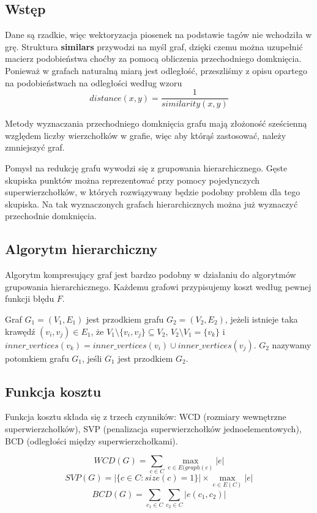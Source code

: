 \documentclass[a4paper,10pt]{article}
\begin{document}
\subsection{Wstęp}
Dane są rzadkie, więc wektoryzacja piosenek na podstawie tagów nie wchodziła w grę. 
Struktura \textbf{similars} przywodzi na myśl graf, dzięki czemu można uzupełnić macierz podobieństwa choćby za pomocą obliczenia przechodniego domknięcia.
Ponieważ w grafach naturalną miarą jest odległość, przeszliśmy z opisu opartego na podobieństwach na odległości według wzoru
\begin{equation}
 distance(x, y) = \frac{1}{similarity(x, y)}
\end{equation}

Metody wyznaczania przechodniego domknięcia grafu mają złożoność sześcienną względem liczby wierzchołków w grafie, 
więc aby którąś zastosować, należy zmniejszyć graf.

Pomysł na redukcję grafu wywodzi się z grupowania hierarchicznego.
Gęste skupiska punktów można reprezentować przy pomocy pojedynczych superwierzchołków, w których rozwiązywany będzie podobny problem dla tego skupiska.
Na tak wyznaczonych grafach hierarchicznych można już wyznaczyć przechodnie domknięcia.

\subsection{Algorytm hierarchiczny}
Algorytm kompresujący graf jest bardzo podobny w działaniu do algorytmów grupowania hierarchicznego.
Każdemu grafowi przypisujemy koszt według pewnej funkcji błędu $F$.

Graf $G_1 = (V_1, E_1)$ jest przodkiem grafu $G_2 = (V_2, E_2)$, jeżeli istnieje taka krawędź $(v_i, v_j) \in E_1$, że $V_1 \setminus \{v_i, v_j\} \subseteq V_2$, 
$V_2 \setminus V_1 = \{v_k\}$ i $inner\_vertices(v_k) = inner\_vertices(v_i) \cup inner\_vertices(v_j)$. 
$G_2$ nazywamy potomkiem grafu $G_1$, jeśli $G_1$ jest przodkiem $G_2$.

\subsection{Funkcja kosztu}
Funkcja kosztu składa się z trzech czynników: WCD (rozmiary wewnętrzne superwierzchołków), 
SVP (penalizacja superwierzchołków jednoelementowych), BCD (odległości między superwierzchołkami).

\begin{equation}
 WCD(G) = \sum_{c \in C} \max_{e \in E(graph(c)} |e|
\end{equation}
\begin{equation}
 SVP(G) = |\{c \in C : size(c) = 1\}| \times \max_{e \in E(C)} |e|
\end{equation}
\begin{equation}
 BCD(G) = \sum_{c_1 \in C} \sum_{c_2 \in C} |e(c_1, c_2)|
\end{equation}
\end{document}

